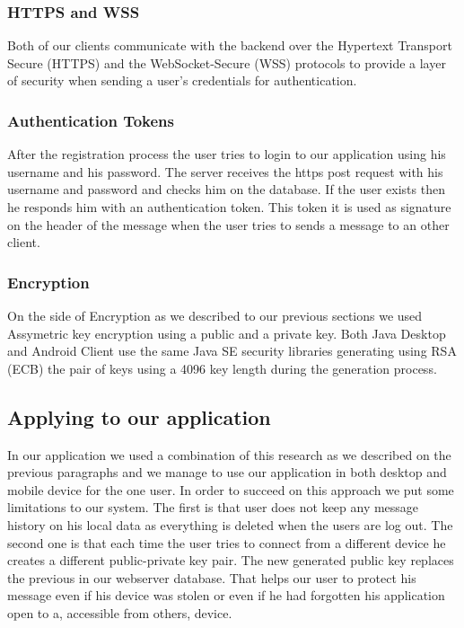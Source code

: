 \documentclass[11pt,a4paper]{report}
\begin{document}
\subsubsection{HTTPS and WSS}
Both of our clients communicate with the backend over the Hypertext Transport Secure (HTTPS) and the WebSocket-Secure (WSS) protocols to provide a layer of security when sending a user's credentials for authentication.

\subsubsection{Authentication Tokens}
After the registration process the user tries to login to our application using his username and his password. The server receives the https post request with his username and password and checks him on the database. If the user exists then he responds him with an authentication token. This token it is used as signature on the header of the message when the user tries to sends a message to an other client.

\subsubsection{Encryption}
On the side of Encryption as we described to our previous sections we used Assymetric key encryption using a public and a private key. Both Java Desktop and Android Client use the same Java SE security libraries generating using RSA (ECB) the pair of keys using a 4096 key length during the generation process.

\subsection{Applying to our application}
In our application we used a combination of this research as we described on the previous paragraphs and we manage to use our application in both desktop and mobile device for the one user. In order to succeed on this approach we put some limitations to our system. The first is that user does not keep any message history on his local data as everything is deleted when the users are log out. The second one is that each time the user tries to connect from a different device he creates a different public-private key pair. The new generated public key replaces the previous in our webserver database. That helps our user to protect his message even if his device was stolen or even if he had forgotten his application open to a, accessible from others, device.
\end{document}
